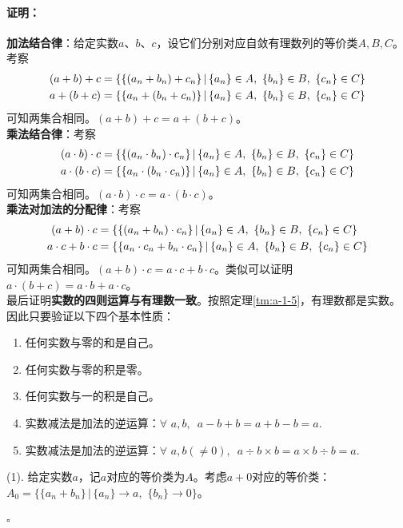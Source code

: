 \documentclass[12pt,UTF8]{ctexbook}
\newenvironment{proof2}{\paragraph{\textbf{证明：}}}{\hfill$\square$}
\begin{document}
\begin{appendix}
\begin{proof2}
    \textbf{加法结合律}：给定实数$a$、$b$、$c$，设它们分别对应自敛有理数列的等价类$A,B,C$。考察
    \begin{align}
        (a + b) + c &= \{\{(a_n + b_n) + c_n\} \, |\, \{a_n\}\in A,\,\,\{b_n\}\in B,\,\,\{c_n\}\in C \} \notag \\
        a + (b + c) &= \{\{a_n + (b_n + c_n)\} \, |\, \{a_n\}\in A,\,\,\{b_n\}\in B,\,\,\{c_n\}\in C \} \notag
    \end{align}
    可知两集合相同。$(a + b) + c = a + (b + c)$。\\
    \textbf{乘法结合律}：考察
    \begin{align}
        (a \cdot b) \cdot c &= \{\{(a_n \cdot b_n) \cdot c_n\} \, |\, \{a_n\}\in A,\,\,\{b_n\}\in B,\,\,\{c_n\}\in C \} \notag \\
        a \cdot (b \cdot c) &= \{\{a_n \cdot (b_n \cdot c_n)\} \, |\, \{a_n\}\in A,\,\,\{b_n\}\in B,\,\,\{c_n\}\in C \} \notag
    \end{align}
    可知两集合相同。$(a \cdot b) \cdot c = a \cdot (b \cdot c)$。\\
    \textbf{乘法对加法的分配律}：考察
    \begin{align}
        (a + b) \cdot c &= \{\{(a_n + b_n) \cdot c_n\} \, |\, \{a_n\}\in A,\,\,\{b_n\}\in B,\,\,\{c_n\}\in C \} \notag \\
        a \cdot c + b \cdot c &= \{\{a_n \cdot c_n + b_n \cdot c_n\} \, |\, \{a_n\}\in A,\,\,\{b_n\}\in B,\,\,\{c_n\}\in C \} \notag
    \end{align}
    可知两集合相同。$(a + b) \cdot c = a \cdot c + b \cdot c$。类似可以证明$a \cdot (b + c) = a \cdot b + a \cdot c$。\\
    最后证明\textbf{实数的四则运算与有理数一致}。按照定理\ref{tm:a-1-5}，有理数都是实数。因此只要验证以下四个基本性质：
    \begin{enumerate}
        \item 任何实数与零的和是自己。
        \item 任何实数与零的积是零。
        \item 任何实数与一的积是自己。
        \item 实数减法是加法的逆运算：$\forall \,\, a, b, \,\,\, a - b + b = a + b - b = a.$
        \item 实数减法是加法的逆运算：$\forall \,\, a, b(\neq 0), \,\,\, a \div b \times b = a\times b \div b = a.$
    \end{enumerate}
    (1). 给定实数$a$，记$a$对应的等价类为$A$。考虑$a+0$对应的等价类：$A_0 = \{ \{a_n + b_n\} \,|\, \{a_n\}\to a, \,\, \{b_n\} \to 0 \}$。

\end{proof2}
\end{appendix}
\end{document}
